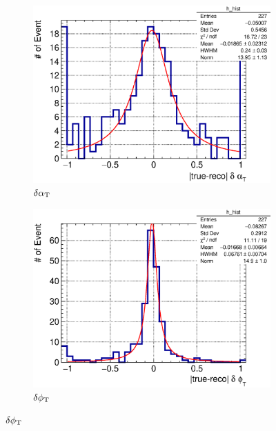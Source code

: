      \begin{figure}
          \begin{subfigure}[b]{\dbfigwid\textwidth}
               \centering
               \includegraphics[width=\textwidth]{figures/perf/tki/SFGpTPCmu_dalphat_rat_hist_al14.eps}
               \caption{$\delta\alpha_\textrm{T}$}
               \label{subfig:1pi-dalpha}
          \end{subfigure}         
          \begin{subfigure}[b]{\dbfigwid\textwidth}
               \centering
               \includegraphics[width=\textwidth]{figures/perf/tki/SFGpTPCmu_dphit_rat_hist_al14.eps}
               \caption{$\delta\phi_\textrm{T}$}
               \label{subfig:1pi-dphit}
          \end{subfigure}

\end{figure}
